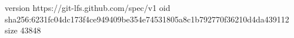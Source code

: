 version https://git-lfs.github.com/spec/v1
oid sha256:6231fc04dc173f4ce949409be354e74531805a8c1b792770f36210d4da439112
size 43848
